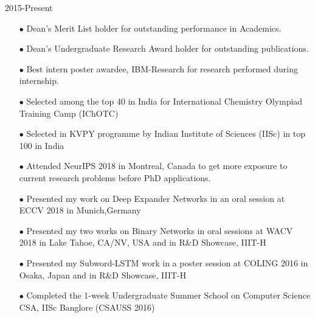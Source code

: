 \documentclass[letterpaper]{page3_formatting} %
\begin{document}
\begin{twenty}
{\begin{enumerate}
    \end{enumerate}
    }{2015-Present}
    
	{
    \begin{enumerate}   
      \item[$\bullet$] Dean's Merit List holder for outstanding performance in Academics.\vspace{0.05cm}
      \item[$\bullet$] Dean's Undergraduate Research Award holder for outstanding publications.\vspace{0.05cm}
       \item[$\bullet$] Best intern poster awardee, IBM-Research for research performed during internship.\vspace{0.05cm}
      \item[$\bullet$] Selected among the top 40 in India for International Chemistry Olympiad Training Camp (IChOTC)\vspace{0.05cm}
      \item[$\bullet$] Selected in KVPY programme by Indian Institute of Sciences (IISc) in top 100 in India
    \end{enumerate}
    }{}
	{
    \begin{enumerate}
    \item[$\bullet$] Attended NeurIPS 2018 in Montreal, Canada to get more exposure to current research problems before PhD applications.\vspace{0.05cm}
    \item[$\bullet$] Presented my work on Deep Expander Networks in an oral session at ECCV 2018 in Munich,Germany\vspace{0.05cm}
    \item[$\bullet$] Presented my two works on Binary Networks in oral sessions at WACV 2018 in Lake Tahoe, CA/NV, USA and in R\&D Showcase, IIIT-H\vspace{0.05cm}
      \item[$\bullet$] Presented my Subword-LSTM work in a poster session at COLING 2016 in Osaka, Japan and in R\&D Showcase, IIIT-H\vspace{0.05cm}
      \item[$\bullet$] Completed the 1-week Undergraduate Summer School on Computer Science CSA, IISc Banglore (CSAUSS 2016) \vspace{0.05cm}

\end{enumerate}}
\end{twenty}
\end{document}
